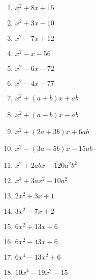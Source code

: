 \begin{solution} \hfill \vspace{-0.8cm}
\begin{multicols}{3}
\begin{enumerate}
\item ${{x}^{2}}+8x+15$	
\item ${{x}^{2}}+3x-10$	
\item ${{x}^{2}}-7x+12$	
\item ${{x}^{2}}-x-56$	
\item ${{x}^{2}}-6x-72$	
\item ${{x}^{2}}-4x-77$	
\item ${{x}^{2}}+(a+b)x+ab$	
\item ${{x}^{2}}+(a-b)x-ab$	
\item ${{x}^{2}}+(2a+3b)x+6ab$	
\item ${{x}^{2}}-(3a-5b)x-15ab$	
\item ${{x}^{2}}+2abx-120{{a}^{2}}{{b}^{2}}$	
\item ${{x}^{4}}+3a{{x}^{2}}-10{{a}^{2}}$	
\item $2{{x}^{2}}+3x+1$
\item $3{{x}^{2}}-7x+2$
\item $6{{x}^{2}}+13x+6$
\item $6{{x}^{2}}-13x+6$
\item $6{{x}^{4}}-13{{x}^{2}}+6$
\item $10{{x}^{4}}-19{{x}^{2}}-15$
\end{enumerate}
\end{multicols}
\end{solution}

